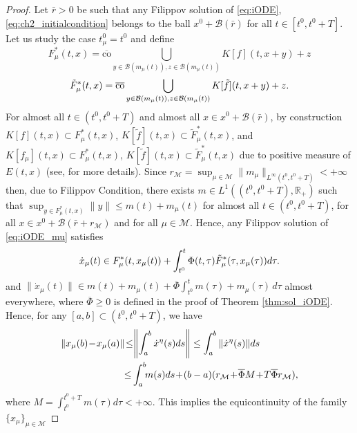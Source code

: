 \documentclass{article}
\newcommand{\R}{\mathbb{R}}
\newcommand{\co}{\mathrm{co}}
\begin{document}
\begin{proof}
	Let $\bar r>0$ be such that any Filippov solution of \eqref{eq:iODE}, \eqref{eq:ch2_initialcondition}
	belongs to the ball $x^0+\mathcal{B}(\bar r)$ for all $t\in[t^0,t^0+T]$.
	Let us study the case $t^0_{\mu}=t^0$ and define
\[
F^{*}_{\mu}(t,x)=\overline{\co} \bigcup_{y\in \mathcal{B}(m_{\mu}(t)),z\in\mathcal{B}(m_{\mu}(t))}K[f](t,x+y)+z
\]
\[
\tilde F^{*}_{\mu}(t,x)=\overline{\co} \bigcup_{y\in \mathcal{B}(m_{\mu}(t)),z\in\mathcal{B}(m_{\mu}(t))}K[\tilde f](t,x+y)+z.\vspace{-1mm}
\]
For almost all $t\in (t^0,t^0+T)$ and almost all $x\in x^0+\mathcal{B}(\bar r)$, by construction $K[f](t,x)\subset F^{*}_{\mu}(t,x)$, $K[\tilde f](t,x)\subset \tilde F^{*}_{\mu}(t,x)$, and
$K[f_{\mu}](t,x)\subset F^{*}_{\mu}(t,x)$, $K[\tilde f](t,x)\subset \tilde F^{*}_{\mu}(t,x)$ due to positive measure of $E(t,x)$ (see, \cite[page 98]{Filippov1988:Book} for more details).
Since $r_{\mathcal{M}}=\sup_{\mu \in \mathcal{M}}\|m_{\mu}\|_{L^{\infty}(t^0,t^0+T)}<+\infty$ then, due to Filippov Condition, 
there exists $m\in L^{1}((t^0,t^0+T),\R_+)$ such that $\sup_{y\in F^*_{\mu}(t,x)}\|y\|\leq m(t)+m_{\mu}(t)$ for almost all $t\in (t^0,t^0+T)$, for all $x\in x^0+\mathcal{B}(\bar r+r_{\mathcal{M}})$ and for all $\mu\in \mathcal{M}$.
Hence, any Filippov solution of \eqref{eq:iODE_mu}  satisfies \vspace{-1mm}
\begin{equation}
	\dot x_{\mu}(t)\in F^*_{\mu}(t,x_{\mu}(t))+\int^t_{t^0} \Phi(t,\tau)\tilde F^{*}_{\mu}(\tau,x_{\mu}(\tau))d\tau.\vspace{-1mm}
\end{equation}
and  $\|\dot x_{\mu}(t)\|\in m(t)+m_{\mu}(t)+\overline{\Phi}\int^t_{t^0} m(\tau)+m_{\mu}(\tau) \, d\tau$ almost everywhere,
where $\overline{\Phi}\geq 0$ is defined in the proof of Theorem \ref{thm:sol_iODE}. 
Hence,  for any $[a,b]\subset (t^0,t^0+T)$, we have\vspace{-1mm}
\[\vspace{-1mm}
\begin{split}
	\|x_{\mu}(b)\!-\!x_{\mu}(a)\|
	\!\leq\! & \left\|\int^b_{a}  {\dot x}^{\eta}(s) ds \right\| \leq \int^b_{a}  \|{\dot x}^{\eta}(s)\| ds\\
	\leq&\int^b_{a} \!\! m(s)ds\!+\!(b-a) (r_{\mathcal{M}}\!+\!\overline{\Phi}M\!+\!T\overline{\Phi} r_{\mathcal{M}}), 
\end{split}
\]
where $M=\int^{t^0+T}_{t^0} m(\tau) d\tau<+\infty$. This implies the equicontinuity of the family $\{x_{\mu}\}_{\mu\in\mathcal{M}}$  

\end{proof}
\end{document}
